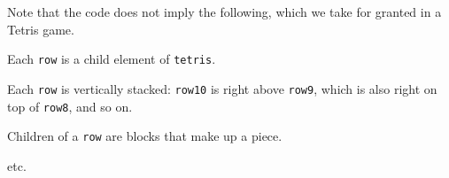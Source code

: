 Note that the code does not imply the following, which we take for granted in a Tetris game.
\begin {compactitem}
\item Each {\tt row} is a child element of {\tt tetris}.
\item Each {\tt row} is vertically stacked: {\tt row10} is right above {\tt row9}, which is also right on top of {\tt row8}, and so on.
\item Children of a {\tt row} are blocks that make up a piece.  
\item etc.
\end {compactitem}







